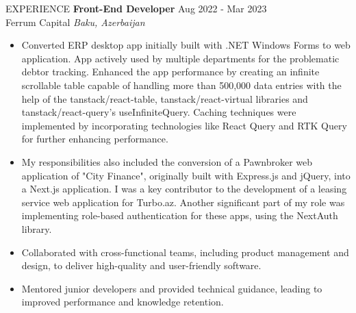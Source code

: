 \documentclass{resume} %
\begin{document}
\begin{rSection}{EXPERIENCE}
\textbf{Front-End Developer} \hfill Aug 2022 - Mar 2023\\
Ferrum Capital \hfill \textit{Baku, Azerbaijan}
 \begin{itemize}
    \itemsep -3pt {}
    \item 
    Converted ERP desktop app initially built with .NET Windows Forms to web application. App actively used by multiple departments for the problematic debtor tracking. Enhanced the app performance by creating an infinite scrollable table capable of handling more than 500,000 data entries with the help of the tanstack/react-table, tanstack/react-virtual libraries and tanstack/react-query's useInfiniteQuery. Caching techniques were implemented by incorporating technologies like React Query and RTK Query for further enhancing performance.
    \item 
    My responsibilities also included the conversion of a Pawnbroker web application of "City Finance", originally built with Express.js and jQuery, into a Next.js application. I was a key contributor to the development of a leasing service web application for Turbo.az. Another significant part of my role was implementing role-based authentication for these apps, using the NextAuth library.
     \item Collaborated with cross-functional teams, including product management and design, to deliver high-quality and user-friendly software.
     \item Mentored junior developers and provided technical guidance, leading to improved performance and knowledge retention.
 \end{itemize}
\end{rSection} 

\end{document}
